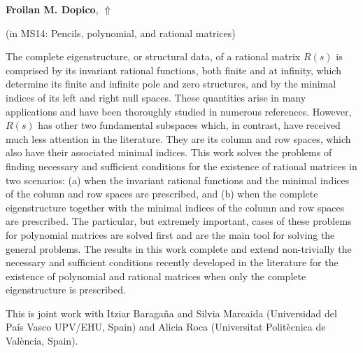 \documentclass[ILAS2025-program.tex]{subfiles}
\begin{document}
\hypertarget{down0330}{}\begin{ilasabstract}
    
\textbf{Froilan M. Dopico},  \hfill \hyperlink{up0330}{$\Uparrow$}
    
    
(in {\color{mstitle}MS14: Pencils, polynomial, and rational matrices})
        
\mtskip
    The complete eigenstructure, or structural data, of a rational matrix
$R(s)$ is comprised by its invariant rational functions, both finite
and at infinity, which determine its finite and infinite pole and zero
structures, and by the minimal indices of its left and right null spaces.
These quantities arise in many applications and have been thoroughly
studied in numerous references. However, $R(s)$ has other two fundamental
subspaces which, in contrast, have received much less attention
in the literature. They are its column and row spaces, which also have
their associated minimal indices. This work solves the problems of
finding necessary and sufficient conditions for the existence of rational
matrices in two scenarios: (a) when the invariant rational functions and the minimal indices of the column and row spaces are prescribed,
and (b) when the complete eigenstructure together with the minimal
indices of the column and row spaces are prescribed. The particular,
but extremely important, cases of these problems for polynomial matrices
are solved first and are the main tool for solving the general
problems. The results in this work complete and extend non-trivially
the necessary and sufficient conditions recently developed in the literature
for the existence of polynomial and rational matrices when only
the complete eigenstructure is prescribed.

This is joint work with Itziar Baraga\~na and Silvia Marcaida (Universidad del Pa\'is Vasco UPV/EHU, Spain) and Alicia Roca (Universitat Polit\`ecnica de Val\`encia, Spain).
\end{ilasabstract}
    
\end{document}
